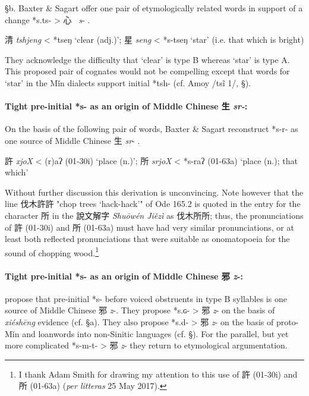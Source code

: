 §b. Baxter \& Sagart offer one pair of etymologically related words in
support of a change *s.ts{}{}- \textgreater{} 心~ \emph{s}- 
\citeyearpar[139]{Baxter2014OldChinese}.

\begin{description} \item
清 \emph{tshjeng} \textless{} *ts{}eŋ `clear (adj.)'; 星  \emph{seng}
\textless{} *s-ts{}{}eŋ `star' (i.e. that which is bright)
\end{description}

They acknowledge the difficulty that `clear' is type B whereas `star' is
type A. This proposed pair of cognates would not be compelling except
that words for `star' in the Mǐn dialects support initial *tsh- (cf.
Amoy /ts{}ĩ 1/, §).

\paragraph{Tight pre-initial *s- as an origin of Middle Chinese
生 \emph{sr-}:} On the basis of the following pair of
words, Baxter \& Sagart reconstruct *s-{}r- as one source of Middle
Chinese 生  \emph{sr}- 
\citeyearpar[129]{Baxter2014OldChinese}.

\begin{description}
\item
許 \emph{xjoX} \textless{} {}(r)aʔ (01-30i) `place (n.)'; 所
 \emph{srjoX} \textless{} *s-{}raʔ (01-63a) `place (n.); that which'
\end{description}

Without further discussion this derivation is unconvincing. Note however
that the line 伐木許許 "chop trees `hack-hack'" of Ode 165.2 is quoted
in the entry for the character 所 in the 說文解字  \emph{Shuōwén Jiězì}
as 伐木所所; thus, the pronunciations of 許 (01-30i) and 所 (01-63a)
must have had very similar pronunciations, or at least both reflected
pronunciations that were suitable as onomatopoeia for the sound of
chopping wood.\footnote{I thank Adam Smith for drawing my attention to
  this use of 許 (01-30i) and 所 (01-63a) (\emph{per litteras} 25 May
  2017).}

\paragraph{Tight pre-initial *s- as an origin
of Middle Chinese 邪 \emph{\textbf{z}}\textbf{-:}} 
\label{par:tight-pre-initial-s-for-MC-z-2}
\citet[141-142]{Baxter2014OldChinese}
propose that pre-initial *s- before voiced obstruents in
type B syllables is one source of Middle Chinese 邪 \emph{z}-. They
propose *s.ɢ- \textgreater{} 邪  \emph{z}- on the basis of
 \emph{xiéshēng} evidence (cf. §a). They also propose *s.d-
\textgreater{} 邪  \emph{z}- on the basis of proto-Mǐn and loanwords into
non-Sinitic languages (cf. §). For the parallel, but yet more
complicated *s-m-t- \textgreater{} 邪  \emph{z}- they return to
etymological argumentation.

